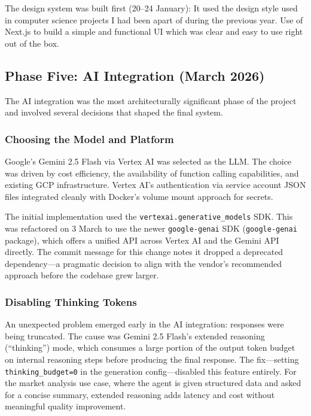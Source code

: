 \documentclass[12pt,a4paper]{article}
\begin{document}
The design system was built first (20--24 January): It used the design style used in computer science projects I had been apart of during the previous year. Use of Next.js to build a simple and functional UI which was clear and easy to use right out of the box.

\subsection{Phase Five: AI Integration (March 2026)}

The AI integration was the most architecturally significant phase of the project and involved several decisions that shaped the final system.

\subsubsection*{Choosing the Model and Platform}

Google's Gemini 2.5 Flash via Vertex AI was selected as the LLM. The choice was driven by cost efficiency, the availability of function calling capabilities, and existing GCP infrastructure. Vertex AI's authentication via service account JSON files integrated cleanly with Docker's volume mount approach for secrets.

The initial implementation used the \texttt{vertexai.generative\_models} SDK. This was refactored on 3 March to use the newer \texttt{google-genai} SDK (\texttt{google-genai} package), which offers a unified API across Vertex AI and the Gemini API directly. The commit message for this change notes it dropped a deprecated dependency---a pragmatic decision to align with the vendor's recommended approach before the codebase grew larger.

\subsubsection*{Disabling Thinking Tokens}

An unexpected problem emerged early in the AI integration: responses were being truncated. The cause was Gemini 2.5 Flash's extended reasoning (``thinking'') mode, which consumes a large portion of the output token budget on internal reasoning steps before producing the final response. The fix---setting \texttt{thinking\_budget=0} in the generation config---disabled this feature entirely. For the market analysis use case, where the agent is given structured data and asked for a concise summary, extended reasoning adds latency and cost without meaningful quality improvement.
\end{document}
